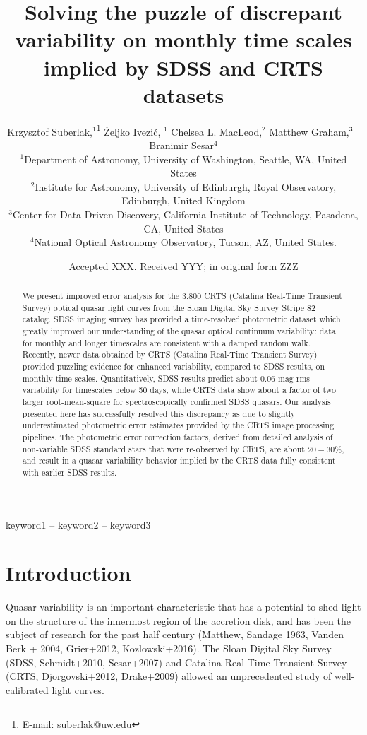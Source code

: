 \documentclass[a4paper,fleqn,usenatbib]{mnras}
\title[Quasar Variability]{Solving the puzzle of discrepant variability on monthly time scales implied by SDSS and CRTS datasets}
\author[K. Suberlak et al.]{
Krzysztof Suberlak,$^{1}$\thanks{E-mail: suberlak@uw.edu}
\v{Z}eljko Ivezi\'c, $^{1}$
Chelsea L. MacLeod,$^{2}$
Matthew Graham,$^{3}$ 
\newauthor
$\, \,  $Branimir Sesar$^{4}$
\\
$^{1}$Department of Astronomy, University of Washington, Seattle, WA, United States\\
$^{2}$Institute for Astronomy, University of Edinburgh, Royal Observatory, Edinburgh, United Kingdom\\
$^{3}$Center for Data-Driven Discovery, California Institute of Technology, Pasadena, CA, United States\\
$^{4}$National Optical Astronomy Observatory, Tucson, AZ, United States.
}
\date{Accepted XXX. Received YYY; in original form ZZZ}
\begin{document}
\label{firstpage}
\pagerange{\pageref{firstpage}--\pageref{lastpage}}
\maketitle

\begin{abstract}

We present improved error analysis for the 3,800 CRTS (Catalina Real-Time Transient Survey) optical quasar light curves from the Sloan Digital Sky Survey Stripe 82 catalog. SDSS imaging survey has provided a time-resolved photometric  dataset which greatly improved our understanding of the quasar optical continuum variability: data for monthly and longer timescales  are consistent with a damped random walk. Recently, newer data  obtained by CRTS (Catalina Real-Time Transient Survey) provided  puzzling evidence for enhanced variability, compared to SDSS results, on monthly time scales. Quantitatively, SDSS results predict  about $0.06$ mag rms variability for timescales below 50 days, while CRTS data show about a factor of two larger root-mean-square  for spectroscopically confirmed SDSS quasars. Our analysis presented here has successfully resolved this discrepancy as due to slightly underestimated photometric error estimates provided by the CRTS image processing pipelines. The photometric error correction factors, derived from detailed analysis of non-variable SDSS standard stars that were re-observed by CRTS, are about $20-30\%$, and result in a quasar variability behavior implied by the CRTS data fully consistent with earlier SDSS results.


\end{abstract}

\begin{keywords}
keyword1 -- keyword2 -- keyword3
\end{keywords}



\section{Introduction}
\label{sec:intro}

Quasar variability is an important characteristic that has a potential to shed light on the structure of the innermost region of the accretion disk, and has been the subject of research for the past half century (Matthew, Sandage 1963, Vanden Berk + 2004, Grier+2012, Kozlowski+2016). The Sloan Digital Sky Survey (SDSS, Schmidt+2010, Sesar+2007) and Catalina Real-Time Transient Survey (CRTS, Djorgovski+2012, Drake+2009) allowed an unprecedented study of well-calibrated light curves. 
\end{document}
